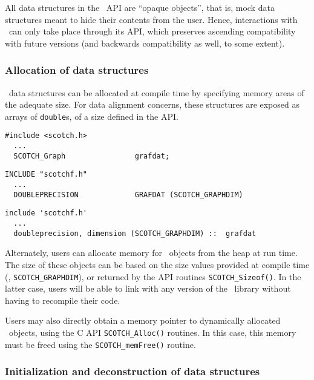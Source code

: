 All data structures in the \scotch\ API are ``opaque objects'', that
is, mock data structures meant to hide their contents from the
user. Hence, interactions with \scotch\ can only take place through
its API, which preserves ascending compatibility with future versions
(and backwards compatibility as well, to some extent).

\subsubsection{Allocation of data structures}

\scotch\ data structures can be allocated at compile time by
specifying memory areas of the adequate size. For data alignment
concerns, these structures are exposed as arrays of \texttt{double}s,
of a size defined in the API.

\begin{lstlisting}[style=language-c]
#include <scotch.h>
  ...
  SCOTCH_Graph                grafdat;
\end{lstlisting}

\begin{lstlisting}[style=language-f]
INCLUDE "scotchf.h"
  ...
  DOUBLEPRECISION             GRAFDAT (SCOTCH_GRAPHDIM)
\end{lstlisting}

\begin{lstlisting}[style=language-f]
include 'scotchf.h'
  ...
  doubleprecision, dimension (SCOTCH_GRAPHDIM) ::  grafdat
\end{lstlisting}

Alternately, users can allocate memory for \scotch\ objects from the
heap at run time. The size of these objects can be based on the size
values provided at compile time (\eg, \texttt{SCOTCH\_\lbt GRAPHDIM}),
or returned by the API routines \texttt{SCOTCH\_\lbt *Sizeof()}. In
the latter case, users will be able to link with any version of the
\scotch\ library without having to recompile their code.

Users may also directly obtain a memory pointer to dynamically
allocated \scotch\ objects, using the \textsc{C} API
\texttt{SCOTCH\_\lbt *Alloc()} routines. In this case, this memory
must be freed using the \texttt{SCOTCH\_\lbt mem\lbt Free()} routine.

\subsubsection{Initialization and deconstruction of data structures}

